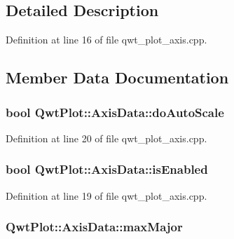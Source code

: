 \subsection{Detailed Description}


Definition at line 16 of file qwt\-\_\-plot\-\_\-axis.\-cpp.



\subsection{Member Data Documentation}
\hypertarget{class_qwt_plot_1_1_axis_data_ac7f9fe88876df54341e4d4c10a79a7e5}{
\subsubsection[{do\-Auto\-Scale}]{\setlength{\rightskip}{0pt plus 5cm}bool Qwt\-Plot\-::\-Axis\-Data\-::do\-Auto\-Scale}}\label{class_qwt_plot_1_1_axis_data_ac7f9fe88876df54341e4d4c10a79a7e5}


Definition at line 20 of file qwt\-\_\-plot\-\_\-axis.\-cpp.

\hypertarget{class_qwt_plot_1_1_axis_data_ab9c68fea44a479e89fb1760b53aafe7d}{
\subsubsection[{is\-Enabled}]{\setlength{\rightskip}{0pt plus 5cm}bool Qwt\-Plot\-::\-Axis\-Data\-::is\-Enabled}}\label{class_qwt_plot_1_1_axis_data_ab9c68fea44a479e89fb1760b53aafe7d}


Definition at line 19 of file qwt\-\_\-plot\-\_\-axis.\-cpp.

\hypertarget{class_qwt_plot_1_1_axis_data_a8e8933b6ead829dc50689e51acd0d619}{
\subsubsection[{max\-Major}]{ Qwt\-Plot\-::\-Axis\-Data\-::max\-Major}}\label{class_qwt_plot_1_1_axis_data_a8e8933b6ead829dc50689e51acd0d619}


